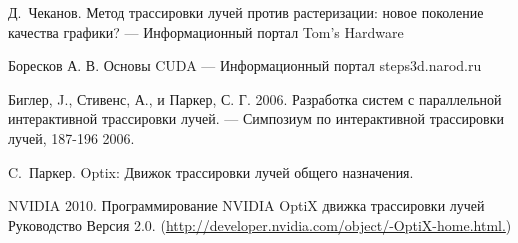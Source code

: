 \newpage
{}
\begin{thebibliography}{0}
Д.~Чеканов. Метод трассировки лучей против растеризации: новое поколение качества графики? ---
 Информационный портал Tom's Hardware

Боресков А. В. Основы CUDA ---  Информационный портал steps3d.narod.ru

Биглер, J., Стивенс, А., и Паркер, С. Г. 2006. Разработка систем с параллельной интерактивной трассировки лучей. --- Симпозиум по интерактивной трассировки лучей, 187-196 2006.

C.~Паркер. Optix: Движок трассировки лучей общего назначения.

NVIDIA 2010. Программирование NVIDIA OptiX движка трассировки лучей 
Руководство Версия 2.0. (\href{http://developer.nvidia.com/object/-OptiX-home.html.}{http://developer.nvidia.com/object/-OptiX-home.html.})
\end{thebibliography}

